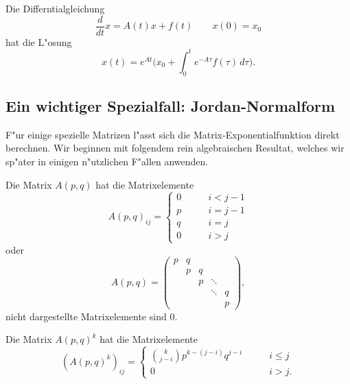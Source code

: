 \begin{satz}\label{linear:inhomogeneloesung}
Die Differntialgleichung
\[
\frac{d}{dt}x = A(t)x + f(t)\qquad x(0)=x_0
\]
hat die L"osung
\[
x(t)
=
e^{At}\biggl(
x_0+\int_0^t e^{-A\tau}f(\tau)\,d\tau
\biggr).
\]
\end{satz}

\subsection{Ein wichtiger Spezialfall: Jordan-Normalform}
F"ur einige spezielle Matrizen l"asst sich die Matrix-Exponentialfunktion
direkt berechnen.
Wir beginnen mit folgendem rein algebraischen Resultat, welches wir
sp"ater in einigen n"utzlichen F"allen anwenden.

\begin{definition}
Die Matrix $A(p,q)$ hat die Matrixelemente
\begin{equation}
A(p,q)_{ij}
=
\begin{cases}
0&\qquad i < j-1\\
p&\qquad i = j-1\\
q&\qquad i = j\\
0&\qquad i > j
\end{cases}
\label{linear:apqmatrixelement}
\end{equation}
oder
\begin{equation}
A(p,q)=\begin{pmatrix}
p&q& &      & \\
 &p&q&      & \\
 & &p&\ddots& \\
 & & &\ddots&q\\
 & & &      &p
\end{pmatrix},
\label{linear:apqmatrix}
\end{equation}
nicht dargestellte Matrixelemente sind $0$.
\end{definition}

\begin{satz}
\label{linear:apq}
Die Matrix $A(p,q)^k$ hat die Matrixelemente
\begin{equation}
(A(p,q)^k)_{ij}
=\begin{cases}
\displaystyle \binom{k}{j-i}p^{k-(j-i)}q^{j-i} &\qquad i\le j\\[2mm]
0                                              &\qquad i>j.
\end{cases}
\label{linear:apqk}
\end{equation}
\end{satz}

